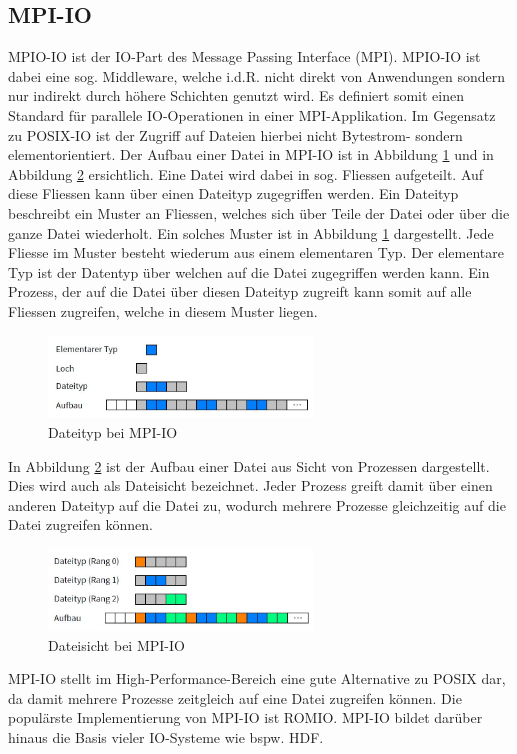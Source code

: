 \subsection{MPI-IO}
MPIO-IO ist der IO-Part des Message Passing Interface (MPI). MPIO-IO ist dabei eine sog. Middleware, welche i.d.R. nicht direkt von Anwendungen sondern nur indirekt durch h\"ohere Schichten genutzt wird. Es definiert somit einen Standard f\"ur parallele IO-Operationen in einer MPI-Applikation. Im Gegensatz zu POSIX-IO ist der Zugriff auf Dateien hierbei nicht Bytestrom- sondern elementorientiert. Der Aufbau einer Datei in MPI-IO ist in Abbildung \ref{fig:dateityp} und in Abbildung \ref{fig:dateisicht} ersichtlich. Eine Datei wird dabei in sog. Fliessen aufgeteilt. Auf diese Fliessen kann \"uber einen Dateityp zugegriffen werden. Ein Dateityp beschreibt ein Muster an Fliessen, welches sich \"uber Teile der Datei oder \"uber die ganze Datei wiederholt. Ein solches Muster ist in Abbildung \ref{fig:dateityp} dargestellt. Jede Fliesse im Muster besteht wiederum aus einem elementaren Typ. Der elementare Typ ist der Datentyp \"uber welchen auf die Datei zugegriffen werden kann. Ein Prozess, der auf die Datei \"uber diesen Dateityp zugreift kann somit auf alle Fliessen zugreifen, welche in diesem Muster liegen.


\begin{figure}[h]
	\centering
	\includegraphics[width=7cm]{fig/Dateityp.jpg}
	\caption{Dateityp bei MPI-IO \cite{Kuhn.13.05.2016}}
	\label{fig:dateityp}
\end{figure}

In Abbildung \ref{fig:dateisicht} ist der Aufbau einer Datei aus Sicht von Prozessen dargestellt. Dies wird auch als Dateisicht bezeichnet. Jeder Prozess greift damit \"uber einen anderen Dateityp auf die Datei zu, wodurch mehrere Prozesse gleichzeitig auf die Datei zugreifen k\"onnen. 

\begin{figure}[h]
	\centering
	\includegraphics[width=7cm]{fig/Dateisicht.jpg}
	\caption{Dateisicht bei MPI-IO \cite{Kuhn.13.05.2016}}
	\label{fig:dateisicht}
\end{figure}
MPI-IO stellt im High-Performance-Bereich eine gute Alternative zu POSIX dar, da damit mehrere Prozesse zeitgleich auf eine Datei zugreifen k\"onnen. Die popul\"arste Implementierung von MPI-IO ist ROMIO. MPI-IO bildet dar\"uber hinaus die Basis vieler IO-Systeme wie bspw. HDF.\cite{Corbett.1995}\cite{Kuhn.13.05.2016}
